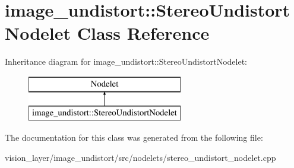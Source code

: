\hypertarget{classimage__undistort_1_1StereoUndistortNodelet}{}\section{image\+\_\+undistort\+:\+:Stereo\+Undistort\+Nodelet Class Reference}
\label{classimage__undistort_1_1StereoUndistortNodelet}
Inheritance diagram for image\+\_\+undistort\+:\+:Stereo\+Undistort\+Nodelet\+:\begin{figure}[H]
\begin{center}
\leavevmode
\includegraphics[height=2.000000cm]{classimage__undistort_1_1StereoUndistortNodelet}
\end{center}
\end{figure}


The documentation for this class was generated from the following file\+:\begin{DoxyCompactItemize}
\item 
vision\+\_\+layer/image\+\_\+undistort/src/nodelets/stereo\+\_\+undistort\+\_\+nodelet.\+cpp\end{DoxyCompactItemize}
